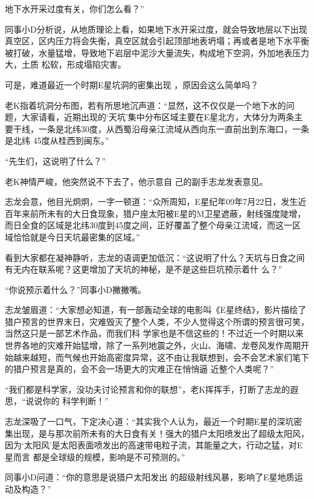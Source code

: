 \documentclass{article}
\begin{document}
地下水开采过度有关，你们怎么看？” 

同事小D分析说，从地质理论上看，如果地下水开采过度，就会导致地层以下出现真空区，区内压力将会失衡，真空区就会引起顶部地表坍塌；再或者是地下水平衡被打破，水量猛增，导致地下岩层中泥沙大量流失，构成地下空洞，外加地表压力大，土质
松软，形成塌陷灾害。 

可是，难道最近一个时期E星坑洞的密集出现
，原因会这么简单吗？ 

老K指着坑洞分布图，若有所思地沉声道：“显然，这不仅仅是一个地下水的问题，大家请看，近期出现的‘天坑’集中分布区域主要在E星北方，大体分为两条主要干线，一条是北纬30度，从西蜀沿母亲江流域从西向东一直前出到东海口，一条是北纬
45度从桂西到闽东。” 


“先生们，这说明了什么？” 

\newpage

老K神情严峻，他突然说不下去了，他示意自
己的副手志龙发表意见。 

志龙会意，他目光炯炯，一字一顿道：“众所周知，E星纪年09年7月22日，发生近百年来前所未有的大日食现象，猎户座太阳被E星的M卫星遮蔽，射线强度陡增，而日全食的区域是北纬30度到45度之间，正好覆盖了整个母亲江流域，而这一区
域恰恰就是今日天坑最密集的区域。” 

看到大家都在凝神静听，志龙的语调更加低沉：“这说明了什么？天坑与日食之间有无内在联系呢？这更增加了天坑的神秘，是不是这些巨坑预示着什
么？” 


“你说预示着什么？”同事小D撇撇嘴。 

志龙皱眉道：“大家想必知道，有一部轰动全球的电影叫《E星终结》，影片描绘了猎户预言的世界末日，灾难毁灭了整个人类，不少人觉得这个所谓的预言很可笑，当然这只是一部艺术作品，而我们科
\newpage
学家也是不信这些的！不过近一个时期以来世界各地的灾难开始猛增，除了一系列地震之外，火山、海啸、龙卷风发作周期开始越来越短，而气候也开始高密度异常，这不由让我联想到，会不会艺术家们笔下的猎户预言是真的，会不会一场更大的灾难正在悄悄逼
近整个人类呢？” 

“我们都是科学家，没功夫讨论预言和你的联想”，老K挥挥手，打断了志龙的遐思，“说说你的
科学判断！” 

志龙深吸了一口气，下定决心道：“其实我个人认为，最近一个时期E星的深坑密集出现，是与那次前所未有的大日食有关！强大的猎户太阳喷发出了超级太阳风，因为‘太阳风’是太阳表面喷发出的高速带电粒子流，其能量之大，行动之猛，对E星而言
都是全球级的规模，影响是不可预测的。” 

同事小D问道：“你的意思是说猎户太阳发出
的超级射线风暴，影响了E星地质运动及构造？” 

\newpage
\end{document}

